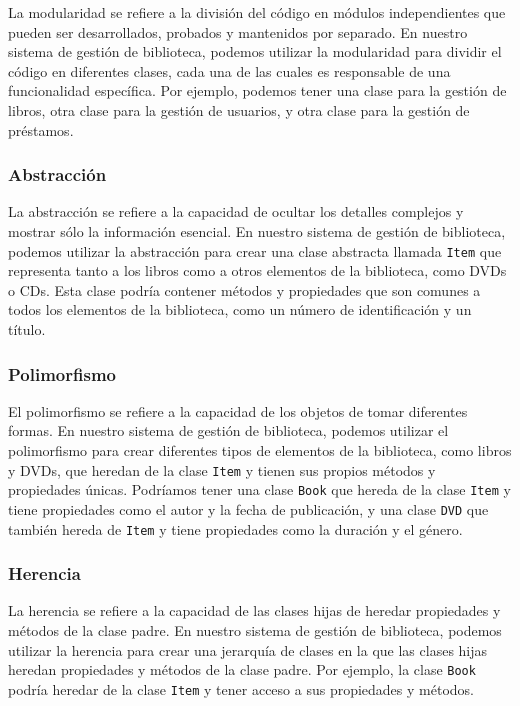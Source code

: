 \documentclass[executivepaper]{article}
\begin{document}
La modularidad se refiere a la división del código en módulos independientes que pueden ser desarrollados, probados y mantenidos por separado. En nuestro sistema de gestión de biblioteca, podemos utilizar la modularidad para dividir el código en diferentes clases, cada una de las cuales es responsable de una funcionalidad específica. Por ejemplo, podemos tener una clase para la gestión de libros, otra clase para la gestión de usuarios, y otra clase para la gestión de préstamos.

\subsubsection*{Abstracción}

La abstracción se refiere a la capacidad de ocultar los detalles complejos y mostrar sólo la información esencial. En nuestro sistema de gestión de biblioteca, podemos utilizar la abstracción para crear una clase abstracta llamada \texttt{Item} que representa tanto a los libros como a otros elementos de la biblioteca, como DVDs o CDs. Esta clase podría contener métodos y propiedades que son comunes a todos los elementos de la biblioteca, como un número de identificación y un título.

\subsubsection*{Polimorfismo}

El polimorfismo se refiere a la capacidad de los objetos de tomar diferentes formas. En nuestro sistema de gestión de biblioteca, podemos utilizar el polimorfismo para crear diferentes tipos de elementos de la biblioteca, como libros y DVDs, que heredan de la clase \texttt{Item} y tienen sus propios métodos y propiedades únicas. Podríamos tener una clase \texttt{Book} que hereda de la clase \texttt{Item} y tiene propiedades como el autor y la fecha de publicación, y una clase \texttt{DVD} que también hereda de \texttt{Item} y tiene propiedades como la duración y el género.

\subsubsection*{Herencia}

La herencia se refiere a la capacidad de las clases hijas de heredar propiedades y métodos de la clase padre. En nuestro sistema de gestión de biblioteca, podemos utilizar la herencia para crear una jerarquía de clases en la que las clases hijas heredan propiedades y métodos de la clase padre. Por ejemplo, la clase \texttt{Book} podría heredar de la clase \texttt{Item} y tener acceso a sus propiedades y métodos.
\end{document}
